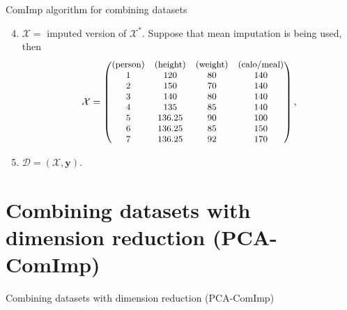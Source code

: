 \documentclass[xcolor={dvipsnames}]{beamer} %
\begin{document}
\begin{frame}{ComImp algorithm for combining datasets}
    \begin{enumerate}
    \setcounter{enumi}{3}
\item $\mathcal{X}=$ imputed version of $\mathcal{X}^*$. Suppose that mean imputation is being used, then
    \begin{equation*}
    \small
        \mathcal{X}=%
        \begin{pmatrix}
    \text{(person)} &\text{(height)} & \text{(weight)} & \text{(calo/meal)}\\
    1 & 120 & 80 & 140\\
    2 & 150 & 70 & 140\\
    3 & 140 & 80 & 140\\
    4 & 135 & 85 & 140\\
    5 & 136.25 & 90 & 100 \\
    6 & 136.25 & 85 & 150\\
    7 & 136.25 & 92 & 170
    \end{pmatrix},
\end{equation*}
\item $\mathcal{D}=(\mathcal{X},\mathbf{y}).$
\end{enumerate}
\end{frame}
\section{Combining datasets with dimension reduction (PCA-ComImp)}
\begin{frame}{Combining datasets with dimension reduction (PCA-ComImp)}
    \begin{block}{}
\end{block}
\end{frame}
\end{document}
